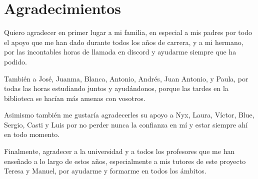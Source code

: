 

\chapter*{Agradecimientos}

Quiero agradecer en primer lugar a mi familia, en especial a mis padres por todo el apoyo que me han dado durante todos los años de carrera, y a mi hermano, por las incontables horas de llamada en discord y ayudarme siempre que ha podido.

También a José, Juanma, Blanca, Antonio, Andrés, Juan Antonio, y Paula, por todas las horas estudiando juntos y ayudándonos, porque las tardes en la biblioteca se hacían más amenas con vosotros.

Asimismo también me gustaría agradecerles su apoyo a Nyx, Laura, Víctor, Blue, Sergio, Casti y Luis por no perder nunca la confianza en mí y estar siempre ahí en todo momento.

Finalmente, agradecer a la universidad y a todos los profesores que me han enseñado a lo largo de estos años, especialmente a mis tutores de este proyecto Teresa y Manuel, por ayudarme y formarme en todos los ámbitos.
